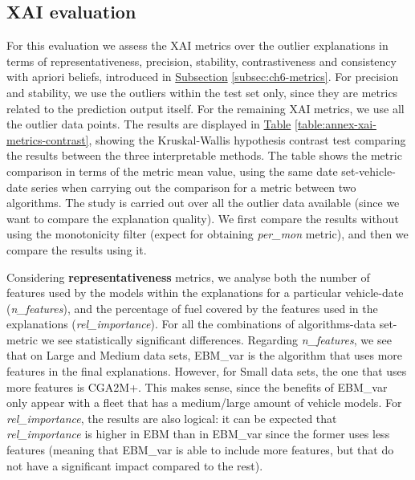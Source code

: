 \subsection{XAI evaluation}\label{subsec:ch6-eval-xai}
For this evaluation we assess the XAI metrics over the outlier explanations in terms of representativeness, precision, stability, contrastiveness and consistency with apriori beliefs, introduced in \hyperref[subsec:ch6-metrics]{Subsection} \ref{subsec:ch6-metrics}. For precision and stability, we use the outliers within the test set only, since they are metrics related to the prediction output itself. For the remaining XAI metrics, we use all the outlier data points.
The results are displayed in \hyperref[table:annex-xai-metrics-contrast]{Table} \ref{table:annex-xai-metrics-contrast}, showing the Kruskal-Wallis hypothesis contrast test \parencite{kruskal1952use} comparing the results between the three interpretable methods. The table shows the metric comparison in terms of the metric mean value, using the same date set-vehicle-date series when carrying out the comparison for a metric between two algorithms. The study is carried out over all the outlier data available (since we want to compare the explanation quality). We first compare the results without using the monotonicity filter (expect for obtaining \textit{per\_mon} metric), and then we compare the results using it.

Considering \textbf{representativeness} metrics, we analyse both the number of features used by the models within the explanations for a particular vehicle-date (\textit{n\_features}), and the percentage of fuel covered by the features used in the explanations (\textit{rel\_importance}). For all the combinations of algorithms-data set-metric we see statistically significant differences. Regarding \textit{n\_features}, we see that on Large and Medium data sets, EBM\_var is the algorithm that uses more features in the final explanations. However, for Small data sets, the one that uses more features is CGA2M+. This makes sense, since the benefits of EBM\_var only appear with a fleet that has a medium/large amount of vehicle models. For \textit{rel\_importance}, the results are also logical: it can be expected that \textit{rel\_importance} is higher in EBM than in EBM\_var since the former uses less features (meaning that EBM\_var is able to include more features, but that do not have a significant impact compared to the rest). 

